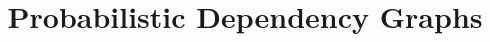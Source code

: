 \documentclass{article}
\title{Probabilistic Dependency Graphs}
\author{} %
\theoremstyle{plain}
\theoremstyle{definition}
\theoremstyle{remark}
\numberwithin{equation}{section}
\begin{document}
	\maketitle
	
	\begin{abstract}

\end{abstract}
\end{document}
